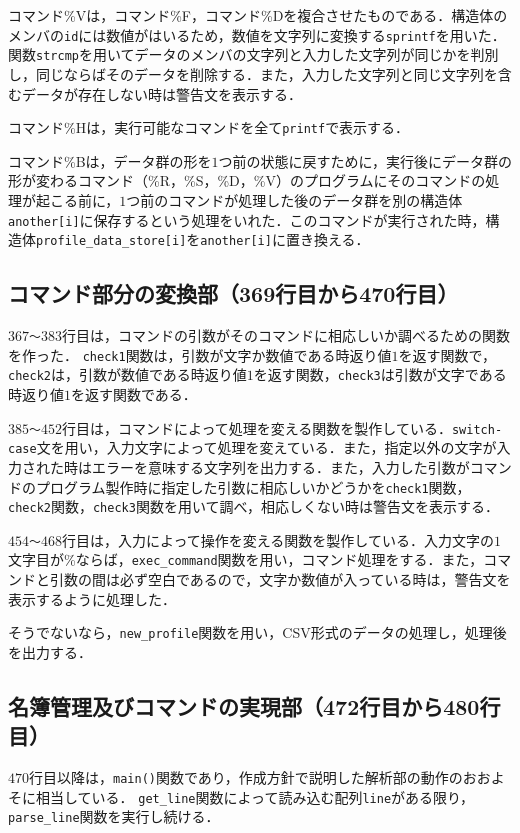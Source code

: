 \documentclass[a4j,11pt]{jarticle}
\begin{document}
コマンド\%Vは，コマンド\%F，コマンド\%Dを複合させたものである．構造体のメンバの\verb|id|には数値がはいるため，数値を文字列に変換する\verb|sprintf|を用いた．関数\verb|strcmp|を用いてデータのメンバの文字列と入力した文字列が同じかを判別し，同じならばそのデータを削除する．また，入力した文字列と同じ文字列を含むデータが存在しない時は警告文を表示する．

コマンド\%Hは，実行可能なコマンドを全て\verb|printf|で表示する．

コマンド\%Bは，データ群の形を$1$つ前の状態に戻すために，実行後にデータ群の形が変わるコマンド（\%R，\%S，\%D，\%V）のプログラムにそのコマンドの処理が起こる前に，$1$つ前のコマンドが処理した後のデータ群を別の構造体\verb|another[i]|に保存するという処理をいれた．このコマンドが実行された時，構造体\verb|profile_data_store[i]|を\verb|another[i]|に置き換える．

\subsection{コマンド部分の変換部（369行目から470行目）}
$367$\verb|～|$383$行目は，コマンドの引数がそのコマンドに相応しいか調べるための関数を作った．
\verb|check1|関数は，引数が文字か数値である時返り値$1$を返す関数で，\verb|check2|は，引数が数値である時返り値$1$を返す関数，\verb|check3|は引数が文字である時返り値$1$を返す関数である．

$385$\verb|～|$452$行目は，コマンドによって処理を変える関数を製作している．\verb|switch-case|文を用い，入力文字によって処理を変えている．また，指定以外の文字が入力された時はエラーを意味する文字列を出力する．また，入力した引数がコマンドのプログラム製作時に指定した引数に相応しいかどうかを\verb|check1|関数，\verb|check2|関数，\verb|check3|関数を用いて調べ，相応しくない時は警告文を表示する．

$454$\verb|～|$468$行目は，入力によって操作を変える関数を製作している．入力文字の$1$文字目が\%ならば，\verb|exec_command|関数を用い，コマンド処理をする．また，コマンドと引数の間は必ず空白であるので，文字か数値が入っている時は，警告文を表示するように処理した．

そうでないなら，\verb|new_profile|関数を用い，CSV形式のデータの処理し，処理後を出力する．

\subsection{名簿管理及びコマンドの実現部（472行目から480行目）}
$470$行目以降は，\verb|main()|関数であり，作成方針で説明した解析部の動作のおおよそに相当している．
\verb|get_line|関数によって読み込む配列\verb|line|がある限り，\verb|parse_line|関数を実行し続ける．
\end{document}
